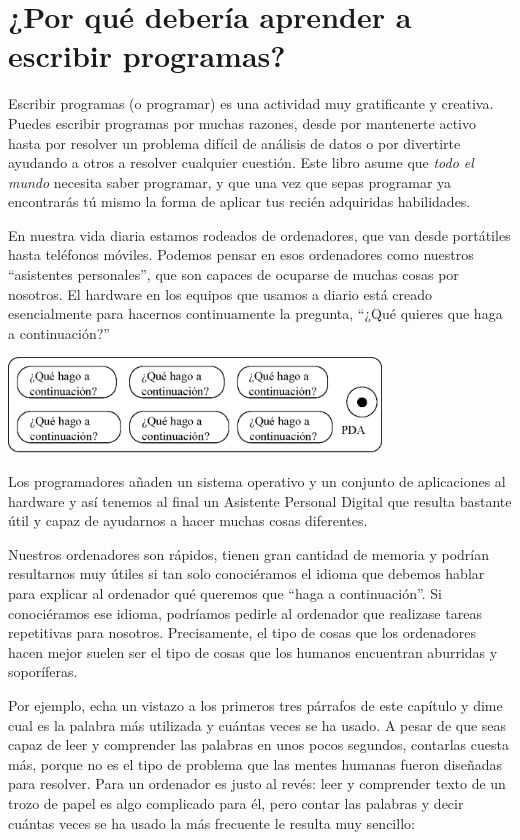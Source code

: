 
\chapter{¿Por qué debería aprender a escribir programas?}

Escribir programas (o programar) es una actividad muy
gratificante y creativa. Puedes escribir programas por
muchas razones, desde por mantenerte activo hasta
por resolver un problema difícil de análisis de datos o
por divertirte ayudando a otros a resolver cualquier cuestión.
Este libro asume que \emph{todo el mundo} necesita saber programar,
y que una vez que sepas programar ya encontrarás tú mismo
la forma de aplicar tus recién adquiridas habilidades.

En nuestra vida diaria estamos rodeados de ordenadores, que van
desde portátiles hasta teléfonos móviles. Podemos pensar en esos
ordenadores como nuestros ``asistentes personales'', que son capaces de
ocuparse de muchas cosas por nosotros. El hardware en los equipos
que usamos a diario está creado esencialmente para hacernos
continuamente la pregunta,
``¿Qué quieres que haga a continuación?''

\beforefig
\centerline{\includegraphics[height=1.00in]{figs2/pda.eps}}
\afterfig

Los programadores añaden un sistema operativo y un conjunto de
aplicaciones al hardware y así tenemos al final un Asistente Personal
Digital que resulta bastante útil y capaz de ayudarnos a hacer
muchas cosas diferentes.

Nuestros ordenadores son rápidos, tienen gran cantidad de memoria
y podrían resultarnos muy útiles si tan solo conociéramos el idioma
que debemos hablar para explicar al ordenador qué queremos que
``haga a continuación''. Si conociéramos ese idioma, podríamos pedirle al
ordenador que realizase tareas repetitivas para nosotros. 
Precisamente, el tipo de cosas que los ordenadores hacen mejor
suelen ser el tipo de cosas que los humanos encuentran aburridas
y soporíferas.

Por ejemplo, echa un vistazo a los primeros tres párrafos de este
capítulo y dime cual es la palabra más utilizada y cuántas veces
se ha usado. A pesar de que seas capaz de leer y comprender
las palabras en unos pocos segundos, contarlas cuesta más,
porque no es el tipo de problema que las mentes humanas
fueron diseñadas para resolver. Para un ordenador
es justo al revés: leer y comprender texto
de un trozo de papel es algo complicado para él,
pero contar las palabras y decir cuántas veces
se ha usado la más frecuente le resulta muy sencillo:

